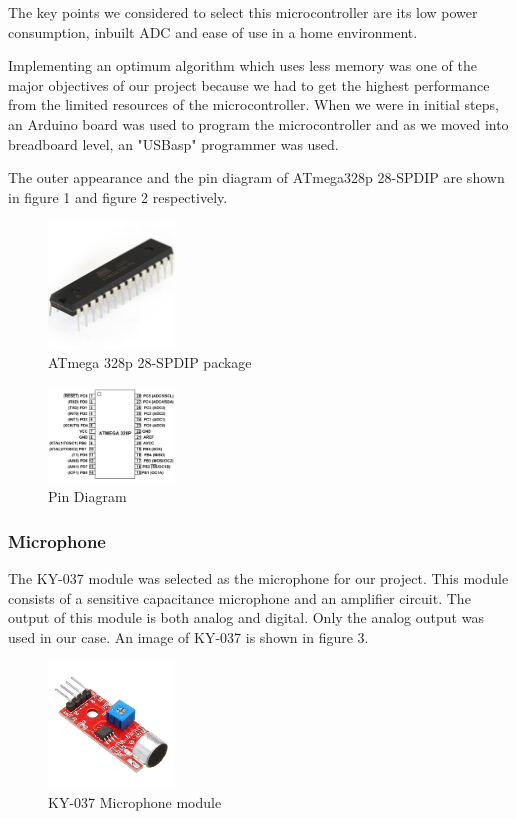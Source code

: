 \documentclass[11pt]{article}
\begin{document}
The key points we considered to select this microcontroller are its low power consumption, inbuilt ADC and ease of use in a home environment. 

Implementing an optimum algorithm which uses less memory was one of the major objectives of our project because we had to get the highest performance from the limited resources of the microcontroller. When we were in initial steps, an Arduino board was used to program the microcontroller and as we moved into breadboard level, an "USBasp" programmer  was used. 

The outer appearance and the pin diagram of ATmega328p 28-SPDIP are shown in figure 1 and figure 2 respectively. 

\begin{figure}
    \centering
    \includegraphics[width=0.3\textwidth]{Images/328p.jpg}
    \caption{ATmega 328p 28-SPDIP package }
\end{figure}

\begin{figure}
    \centering
    \includegraphics[width=0.3\textwidth]{Images/328p pinout.png}
    \caption{Pin Diagram }
\end{figure}

\subsubsection{Microphone}
The KY-037 module was selected as the microphone for our project. This module consists of a sensitive capacitance microphone and an amplifier circuit. The output of this module is both analog and digital. Only the analog output was used in our case. An image of KY-037 is shown in figure 3. 
\begin{figure}
    \centering
    \includegraphics[width=0.3\textwidth]{Images/mic.jpg}
    \caption{KY-037 Microphone module}
\end{figure}
\end{document}
